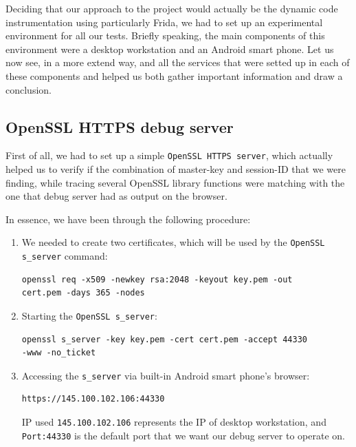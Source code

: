 \documentclass[12pt, a4paper]{report}
\begin{document}
Deciding that our approach to the project would actually be the dynamic code instrumentation using particularly Frida, we had to set up an experimental environment for all our tests. Briefly speaking, the main components of this environment were a desktop workstation and an Android smart phone. Let us now see, in a more extend way, and all the services that were setted up in each of these components and helped us both gather important information and draw a conclusion.    

\subsection{OpenSSL HTTPS debug server}

First of all, we had to set up a simple \texttt{OpenSSL HTTPS server}, which actually helped us to verify if the combination of master-key and session-ID that we were finding, while tracing several OpenSSL library functions were matching with the one that debug server had as output on the browser.

In essence, we have been through the following procedure:

\begin{enumerate}
\item We needed to create two certificates, which will be used by the \texttt{OpenSSL s\_server} command:
\begin{lstlisting}[frame=single, breaklines=true]
openssl req -x509 -newkey rsa:2048 -keyout key.pem -out
cert.pem -days 365 -nodes	
\end{lstlisting}	

\item Starting the \texttt{OpenSSL s\_server}:
\begin{lstlisting}[frame=single, breaklines=true]
openssl s_server -key key.pem -cert cert.pem -accept 44330
-www -no_ticket
\end{lstlisting}

\item Accessing the \texttt{s\_server} via built-in Android smart phone's browser:
\begin{lstlisting}[frame=single, breaklines=true]
https://145.100.102.106:44330
\end{lstlisting}
IP used \texttt{145.100.102.106} represents the IP of desktop workstation, and \texttt{Port:44330} is the default port that we want our debug server to operate on.  

\end{enumerate}
\end{document}
